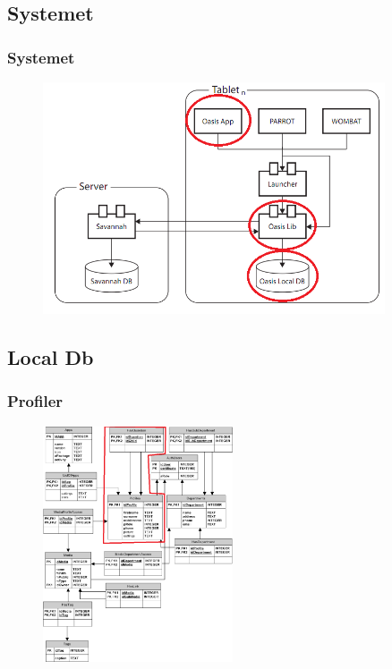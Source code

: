 \documentclass{beamer}
\begin{document}
\subsection{Systemet}

\begin{frame}
	\frametitle{Systemet}
	\begin{figure}[!h]
		\centering
			\includegraphics[width=0.9\textwidth]{GIRAF.PNG}
		\label{fig:Giraf_comp}
	\end{figure}
\end{frame}

\subsection{Local Db}

\begin{frame}
	\frametitle{Profiler}
	
	\begin{figure}[!h]
		\centering
			\includegraphics[width=0.5\textwidth]{dbProfiler}
		\label{fig:profiler}
	\end{figure}
\end{frame}
\end{document}
